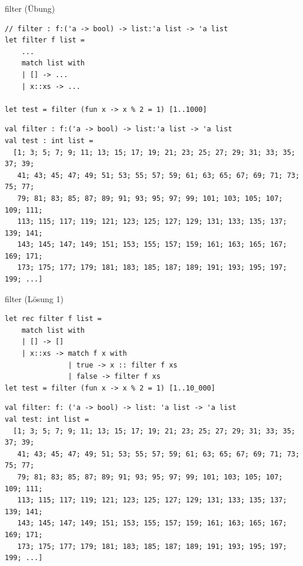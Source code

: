 \documentclass[t]{beamer}
\begin{document}
\begin{frame}[label={sec:orgfd73fcc},fragile]{filter (Übung)}
 \begin{verbatim}
// filter : f:('a -> bool) -> list:'a list -> 'a list
let filter f list =
    ...
    match list with
    | [] -> ...
    | x::xs -> ...

let test = filter (fun x -> x % 2 = 1) [1..1000]
\end{verbatim}

\begin{verbatim}
val filter : f:('a -> bool) -> list:'a list -> 'a list
val test : int list =
  [1; 3; 5; 7; 9; 11; 13; 15; 17; 19; 21; 23; 25; 27; 29; 31; 33; 35; 37; 39;
   41; 43; 45; 47; 49; 51; 53; 55; 57; 59; 61; 63; 65; 67; 69; 71; 73; 75; 77;
   79; 81; 83; 85; 87; 89; 91; 93; 95; 97; 99; 101; 103; 105; 107; 109; 111;
   113; 115; 117; 119; 121; 123; 125; 127; 129; 131; 133; 135; 137; 139; 141;
   143; 145; 147; 149; 151; 153; 155; 157; 159; 161; 163; 165; 167; 169; 171;
   173; 175; 177; 179; 181; 183; 185; 187; 189; 191; 193; 195; 197; 199; ...]
\end{verbatim}
\end{frame}

\begin{frame}[label={sec:org3ef1dd5},fragile]{filter (Lösung 1)}
 \begin{verbatim}
let rec filter f list = 
    match list with
    | [] -> []
    | x::xs -> match f x with
               | true -> x :: filter f xs
               | false -> filter f xs
let test = filter (fun x -> x % 2 = 1) [1..10_000]
\end{verbatim}

\begin{verbatim}
val filter: f: ('a -> bool) -> list: 'a list -> 'a list
val test: int list =
  [1; 3; 5; 7; 9; 11; 13; 15; 17; 19; 21; 23; 25; 27; 29; 31; 33; 35; 37; 39;
   41; 43; 45; 47; 49; 51; 53; 55; 57; 59; 61; 63; 65; 67; 69; 71; 73; 75; 77;
   79; 81; 83; 85; 87; 89; 91; 93; 95; 97; 99; 101; 103; 105; 107; 109; 111;
   113; 115; 117; 119; 121; 123; 125; 127; 129; 131; 133; 135; 137; 139; 141;
   143; 145; 147; 149; 151; 153; 155; 157; 159; 161; 163; 165; 167; 169; 171;
   173; 175; 177; 179; 181; 183; 185; 187; 189; 191; 193; 195; 197; 199; ...]
\end{verbatim}
\end{frame}
\end{document}
